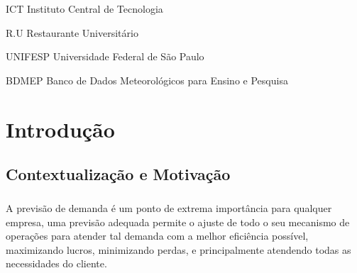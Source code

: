 \documentclass[	12pt, Times, openright, twoside, a4paper, english, brazil]{abntex2}
\begin{document}
\listoffigures*
\cleardoublepage

\listoftables*
\cleardoublepage

\begin{siglas}
\item[ICT] Instituto Central de Tecnologia
\item[R.U] Restaurante Universitário
\item[UNIFESP] Universidade Federal de São Paulo
\item[BDMEP] Banco de Dados Meteorológicos para Ensino e Pesquisa

\end{siglas}


\tableofcontents*
\cleardoublepage

\textual

\chapter{Introdução}
\section{Contextualização e Motivação}

\paragraph*{} A previsão de demanda é um ponto de extrema importância para qualquer empresa, uma previsão adequada permite o ajuste de todo o seu mecanismo de operações para atender tal demanda com a melhor eficiência possível, maximizando lucros, minimizando perdas, e principalmente atendendo todas as necessidades do cliente.
\end{document}
